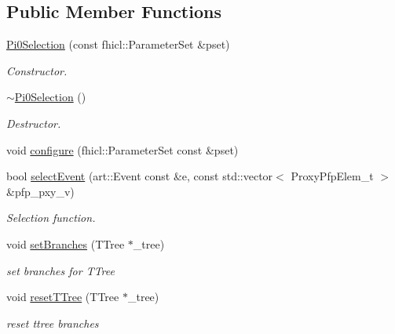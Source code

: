 \subsection*{Public Member Functions}
\begin{DoxyCompactItemize}
\item 
\hyperlink{classselection_1_1Pi0Selection_a96b0ec7f6597fa143e9478a6e71f5e76}{Pi0\+Selection} (const fhicl\+::\+Parameter\+Set \&pset)
\begin{DoxyCompactList}\small\item\em Constructor. \end{DoxyCompactList}\item 
\hyperlink{classselection_1_1Pi0Selection_ad691918c955035275406f16331ba0631}{$\sim$\+Pi0\+Selection} ()\hypertarget{classselection_1_1Pi0Selection_ad691918c955035275406f16331ba0631}{}\label{classselection_1_1Pi0Selection_ad691918c955035275406f16331ba0631}

\begin{DoxyCompactList}\small\item\em Destructor. \end{DoxyCompactList}\item 
void \hyperlink{classselection_1_1Pi0Selection_a0f845ce49bdafea967214a0ac981ab87}{configure} (fhicl\+::\+Parameter\+Set const \&pset)
\item 
bool \hyperlink{classselection_1_1Pi0Selection_a1efba82b7ec3c2e18a48a98605720009}{select\+Event} (art\+::\+Event const \&e, const std\+::vector$<$ Proxy\+Pfp\+Elem\+\_\+t $>$ \&pfp\+\_\+pxy\+\_\+v)
\begin{DoxyCompactList}\small\item\em Selection function. \end{DoxyCompactList}\item 
void \hyperlink{classselection_1_1Pi0Selection_ab5e8ca896ae6aa1e2e37c437a2b29016}{set\+Branches} (T\+Tree $\ast$\+\_\+tree)
\begin{DoxyCompactList}\small\item\em set branches for T\+Tree \end{DoxyCompactList}\item 
void \hyperlink{classselection_1_1Pi0Selection_a70d28f2b466a735199640520c22fa725}{reset\+T\+Tree} (T\+Tree $\ast$\+\_\+tree)\hypertarget{classselection_1_1Pi0Selection_a70d28f2b466a735199640520c22fa725}{}\label{classselection_1_1Pi0Selection_a70d28f2b466a735199640520c22fa725}

\begin{DoxyCompactList}\small\item\em reset ttree branches \end{DoxyCompactList}\end{DoxyCompactItemize}
